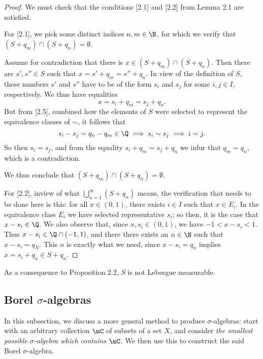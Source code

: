 \documentclass[pmath450]{subfiles}
\begin{document}
    \begin{proof}
        We must check that the conditions [2.1] and [2.2] from Lemma 2.1 are satisfied.

        For [2.1], we pick some distinct indices $n,m\in\N$, for which we verify that $\left( S+q_m \right)\cap\left( S+q_n \right)=\emptyset$.

        Assume for contradiction that there is $x\in\left( S+q_m \right)\cap\left( S+q_n \right)$. Then there are $s',s''\in S$ such that $x=s'+q_m=s''+q_n$. In view of the definition of $S$, these numbers $s'$ and $s''$ have to be of the form $s_i$ and $s_j$ for some $i,j\in I$, respectively. We thus have equalities
        \begin{equation}
            x = s_i+q_m = s_j+q_n.
        \end{equation}
        But from [2.5], combined how the elements of $S$ were selected to represent the equivalence classes of $\sim$, it follows that
        \begin{equation*}
            s_i-s_j = q_n-q_m \in\Q\implies s_i\sim s_j\implies i=j.
        \end{equation*}
        So then $s_i=s_j$, and from the equality $s_i+q_m=s_j+q_n$ we infur that $q_m=q_n$, which is a contradiction.

        We thus conclude that $\left( S+q_m \right)\cap\left( S+q_n \right)=\emptyset$.

        For [2.2], inview of what $\bigcup^{\infty}_{n=1}\left( S+q_n \right)$ means, the verification that needs to be done here is this: for all $x\in\left( 0,1 \right)$, there exists $i\in I$ such that $x\in E_i$. In the equivalence class $E_i$ we have selected representative $s_i$; so then, it is the case that $x-s_i\in\Q$. We also observe that, since $x,s_i\in\left( 0,1 \right)$, we have $-1<x-s_i<1$. Thus $x-s_i\in\Q\cap\left( -1,1 \right)$, and there there exists an $n\in\N$ such that $x-s_i=q_N$. This $n$ is exactly what we need, since $x-s_i=q_n$ implies $x=s_i+q_n\in S+q_n$.
    \end{proof}

    \np As a consequence to Proposition 2.2, $S$ is not Lebesgue measurable.

    \subsection{Borel $\sigma$-algebras}
    
    In this subsection, we discuss a more general method to produce $\sigma$-algebras: start with an arbitrary collection $\mC$ of subsets of a set $X$, and consider \textit{the smallest possible $\sigma$-algebra which contains $\mC$.} We then use this to construct the said Borel $\sigma$-algebra.
\end{document}
